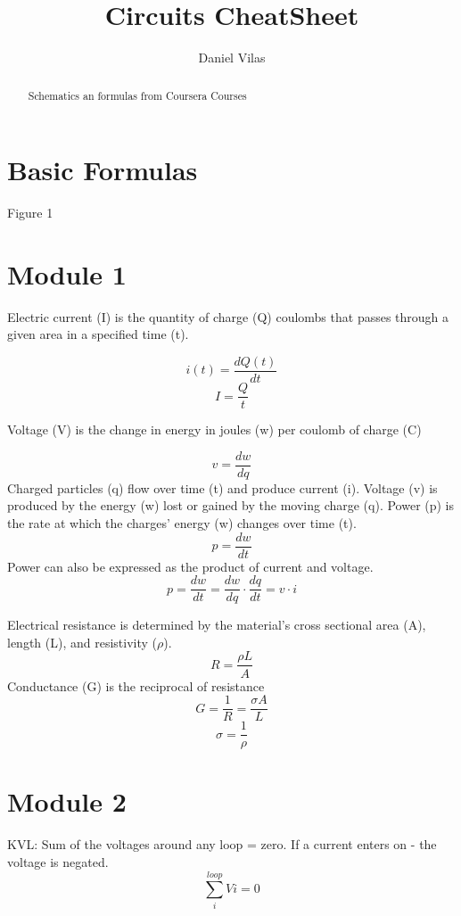 \documentclass[]{article}
\title{Circuits CheatSheet}
\author{Daniel Vilas}
\begin{document}
\maketitle

\begin{abstract}
Schematics an formulas from Coursera Courses
\end{abstract}

\section{Basic Formulas}

Figure 1

\section{Module 1}
Electric current (I) is the quantity of charge (Q) coulombs that passes through a given area in a specified time (t).

$$i(t)=\frac{dQ(t)}{dt}$$
$$I=\frac{Q}{t}$$

Voltage (V) is the change in energy in joules (w) per coulomb of charge (C)

$$v=\frac{dw}{dq}$$
Charged particles (q) flow over time (t) and produce current (i).
Voltage (v) is produced by the energy (w) lost or gained by the moving charge (q).
Power (p) is the rate at which the charges’ energy (w) changes over time (t).
$$p=\frac{dw}{dt}$$
Power can also be expressed as the product of current and voltage.
$$p=\frac{dw}{dt}=\frac{dw}{dq}\cdot\frac{dq}{dt}=v\cdot i$$

Electrical resistance is determined by the material’s cross sectional area (A), length (L), and resistivity ($\rho$).
$$R=\frac{\rho L}{A}$$
Conductance (G) is the reciprocal of resistance
$$G=\frac{1}{R}=\frac{\sigma A}{L}$$
$$\sigma = \frac{1}{\rho}$$


\section{Module 2}
KVL: Sum of the voltages around any loop = zero. If a current enters on - the voltage is negated.
$$\sum_{i}^{loop} Vi =0 $$
\end{document}

